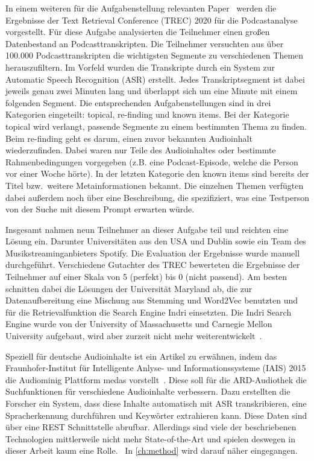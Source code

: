 In einem weiteren für die Aufgabenstellung relevanten Paper~\cite{jones2021} werden die Ergebnisse der Text Retrieval Conference (TREC) 2020 für die Podcastanalyse vorgestellt.
Für diese Aufgabe analysierten die Teilnehmer einen großen Datenbestand an Podcasttranskripten.
Die Teilnehmer versuchten aus über 100.000 Podcasttranskripten die wichtigsten Segmente zu verschiedenen Themen herauszufiltern.
Im Vorfeld wurden die Transkripte durch ein System zur Automatic Speech Recognition (ASR) erstellt.
Jedes Transkriptsegment ist dabei jeweils genau zwei Minuten lang und überlappt sich um eine Minute mit einem folgenden Segment.
Die entsprechenden Aufgabenstellungen sind in drei Kategorien eingeteilt: topical, re-finding und known items.
Bei der Kategorie topical wird verlangt, passende Segmente zu einem bestimmten Thema zu finden.
Beim re-finding geht es darum, einen zuvor bekannten Audioinhalt wiederzufinden.
Dabei waren nur Teile des Audioinhaltes oder bestimmte Rahmenbedingungen vorgegeben (z.B. eine Podcast-Episode, welche die Person vor einer Woche hörte).
In der letzten Kategorie den known items sind bereits der Titel bzw.\ weitere Metainformationen bekannt.
Die einzelnen Themen verfügten dabei außerdem noch über eine Beschreibung, die spezifiziert, was eine Testperson von der Suche mit diesem Prompt erwarten würde.


Insgesamt nahmen neun Teilnehmer an dieser Aufgabe teil und reichten eine Lösung ein.
Darunter Universitäten aus den USA und Dublin sowie ein Team des Musikstreaminganbieters Spotify.
Die Evaluation der Ergebnisse wurde manuell durchgeführt.
Verschiedene Gutachter des TREC bewerteten die Ergebnisse der Teilnehmer auf einer Skala von 5 (perfekt) bis 0 (nicht passend).
Am besten schnitten dabei die Lösungen der Universität Maryland ab, die zur Datenaufbereitung eine Mischung aus Stemming und Word2Vec benutzten und für die Retrievalfunktion die Search Engine Indri einsetzten.
Die Indri Search Engine wurde von der University of Massachusetts und Carnegie Mellon University aufgebaut, wird aber zurzeit nicht mehr weiterentwickelt~\cite{lemur}.


Speziell für deutsche Audioinhalte ist ein Artikel zu erwähnen, indem das Fraunhofer-Institut für Intelligente Anlyse- und Informationssysteme (IAIS) 2015 die Audiominig Plattform medas vorstellt~\cite{maroni2020}.
Diese soll für die ARD-Audiothek die Suchfunktionen für verschiedene Audioinhalte verbessern.
Dazu erstellten die Forscher ein System, dass diese Inhalte automatisch mit ASR transkribieren, eine Spracherkennung durchführen und Keywörter extrahieren kann.
Diese Daten sind über eine REST Schnittstelle abrufbar.
Allerdings sind viele der beschriebenen Technologien mittlerweile nicht mehr State-of-the-Art und spielen deswegen in dieser Arbeit kaum eine Rolle.~\cite{maroni2020}
In \autoref{ch:method} wird darauf näher eingegangen.
